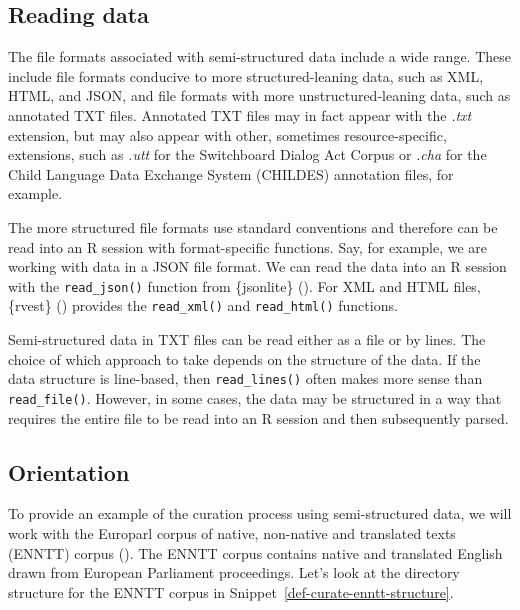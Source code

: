 \documentclass[
  letterpaper,
  krantz1]{latex/krantz-mod}
\theoremstyle{definition}
\theoremstyle{definition}
\theoremstyle{remark}
\begin{document}
\subsection{Reading data}\label{reading-data-1}

The file formats associated with semi-structured data include a wide
range. These include file formats conducive to more structured-leaning
data, such as XML,
HTML, and
JSON, and file formats with
more unstructured-leaning data, such as annotated TXT
files. Annotated TXT files may in fact appear with the
\emph{.txt} extension, but may also appear with other, sometimes
resource-specific, extensions, such as \emph{.utt} for the Switchboard
Dialog Act Corpus or \emph{.cha} for the Child Language Data Exchange
System (CHILDES)
annotation files, for example.

The more structured file formats use standard conventions and therefore
can be read into an R session with format-specific functions. Say, for
example, we are working with data in a JSON file format. We can read the
data into an R session with the \texttt{read\_json()} function from
\{jsonlite\} (). For XML and HTML
files, \{rvest\} () provides the
\texttt{read\_xml()} and \texttt{read\_html()}
functions.

Semi-structured data in TXT files can be read either as a file or by
lines. The choice of which approach to take depends on the structure of
the data. If the data structure is line-based, then
\texttt{read\_lines()} often makes more sense than
\texttt{read\_file()}. However, in some cases, the data may be
structured in a way that requires the entire file to be read into an R
session and then subsequently parsed.

\subsection{Orientation}\label{sec-curate-semi-structured-orientation}

To provide an example of the curation process using semi-structured
data, we will work with the Europarl corpus of native, non-native and
translated texts (ENNTT) corpus ().
The ENNTT corpus contains native and translated English drawn from
European Parliament proceedings. Let's look at the directory structure
for the ENNTT corpus in Snippet~\ref{def-curate-enntt-structure}.
\end{document}
